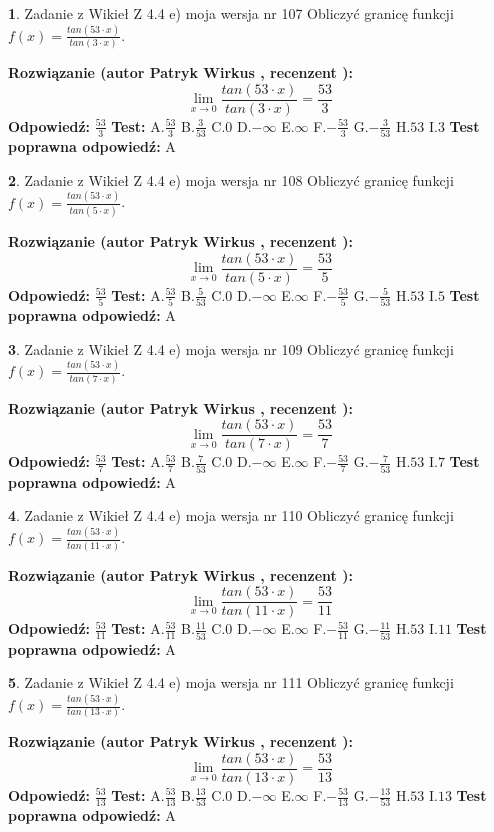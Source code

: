 \documentclass[12pt, a4paper]{article}
\theoremstyle{definition} %
\newtheorem{zad}{}
\newcommand{\zadStart}[1]{\begin{zad}#1\newline}
\newcommand{\zadStop}{\end{zad}}
\newcommand{\rozwStart}[2]{\noindent \textbf{Rozwiązanie (autor #1 , recenzent #2): }\newline}
\newcommand{\rozwStop}{\newline}
\newcommand{\odpStart}{\noindent \textbf{Odpowiedź:}\newline}
\newcommand{\odpStop}{\newline}
\newcommand{\testStart}{\noindent \textbf{Test:}\newline}
\newcommand{\testStop}{\newline}
\newcommand{\kluczStart}{\noindent \textbf{Test poprawna odpowiedź:}\newline}
\newcommand{\kluczStop}{\newline}
\begin{document}
\zadStart{Zadanie z Wikieł Z 4.4 e) moja wersja nr 107}
Obliczyć granicę funkcji $f(x)=\frac{tan(53\cdot x)}{tan(3\cdot x)}$.
\zadStop
\rozwStart{Patryk Wirkus}{}
$$\lim\limits_{x\to 0}\frac{tan(53\cdot x)}{tan(3\cdot x)}=
\frac{53}{3}$$
\rozwStop
\odpStart
$\frac{53}{3}$
\odpStop
\testStart
A.$\frac{53}{3}$
B.$\frac{3}{53}$
C.$0$
D.$-\infty$
E.$\infty$
F.$-\frac{53}{3}$
G.$-\frac{3}{53}$
H.$53$
I.$3$
\testStop
\kluczStart
A
\kluczStop



\zadStart{Zadanie z Wikieł Z 4.4 e) moja wersja nr 108}
Obliczyć granicę funkcji $f(x)=\frac{tan(53\cdot x)}{tan(5\cdot x)}$.
\zadStop
\rozwStart{Patryk Wirkus}{}
$$\lim\limits_{x\to 0}\frac{tan(53\cdot x)}{tan(5\cdot x)}=
\frac{53}{5}$$
\rozwStop
\odpStart
$\frac{53}{5}$
\odpStop
\testStart
A.$\frac{53}{5}$
B.$\frac{5}{53}$
C.$0$
D.$-\infty$
E.$\infty$
F.$-\frac{53}{5}$
G.$-\frac{5}{53}$
H.$53$
I.$5$
\testStop
\kluczStart
A
\kluczStop



\zadStart{Zadanie z Wikieł Z 4.4 e) moja wersja nr 109}
Obliczyć granicę funkcji $f(x)=\frac{tan(53\cdot x)}{tan(7\cdot x)}$.
\zadStop
\rozwStart{Patryk Wirkus}{}
$$\lim\limits_{x\to 0}\frac{tan(53\cdot x)}{tan(7\cdot x)}=
\frac{53}{7}$$
\rozwStop
\odpStart
$\frac{53}{7}$
\odpStop
\testStart
A.$\frac{53}{7}$
B.$\frac{7}{53}$
C.$0$
D.$-\infty$
E.$\infty$
F.$-\frac{53}{7}$
G.$-\frac{7}{53}$
H.$53$
I.$7$
\testStop
\kluczStart
A
\kluczStop



\zadStart{Zadanie z Wikieł Z 4.4 e) moja wersja nr 110}
Obliczyć granicę funkcji $f(x)=\frac{tan(53\cdot x)}{tan(11\cdot x)}$.
\zadStop
\rozwStart{Patryk Wirkus}{}
$$\lim\limits_{x\to 0}\frac{tan(53\cdot x)}{tan(11\cdot x)}=
\frac{53}{11}$$
\rozwStop
\odpStart
$\frac{53}{11}$
\odpStop
\testStart
A.$\frac{53}{11}$
B.$\frac{11}{53}$
C.$0$
D.$-\infty$
E.$\infty$
F.$-\frac{53}{11}$
G.$-\frac{11}{53}$
H.$53$
I.$11$
\testStop
\kluczStart
A
\kluczStop



\zadStart{Zadanie z Wikieł Z 4.4 e) moja wersja nr 111}
Obliczyć granicę funkcji $f(x)=\frac{tan(53\cdot x)}{tan(13\cdot x)}$.
\zadStop
\rozwStart{Patryk Wirkus}{}
$$\lim\limits_{x\to 0}\frac{tan(53\cdot x)}{tan(13\cdot x)}=
\frac{53}{13}$$
\rozwStop
\odpStart
$\frac{53}{13}$
\odpStop
\testStart
A.$\frac{53}{13}$
B.$\frac{13}{53}$
C.$0$
D.$-\infty$
E.$\infty$
F.$-\frac{53}{13}$
G.$-\frac{13}{53}$
H.$53$
I.$13$
\testStop
\kluczStart
A
\kluczStop
\end{document}
